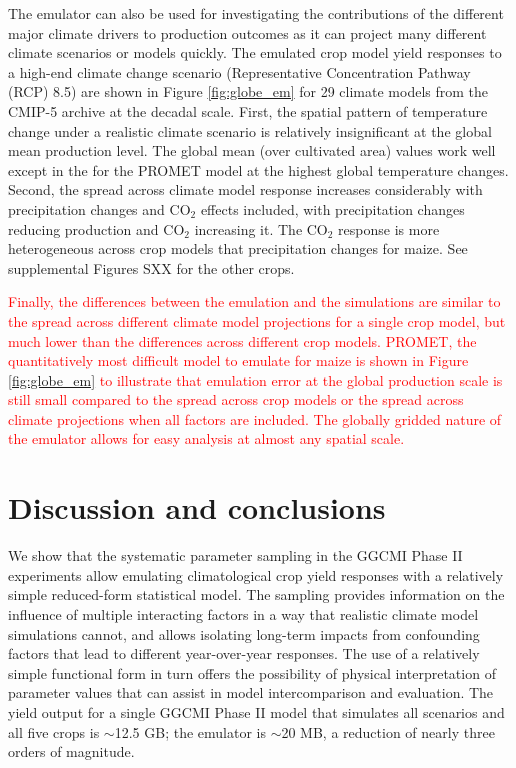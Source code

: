 \documentclass[gmd, manuscript]{copernicus} %
\begin{document}
The emulator can also be used for investigating the contributions of the different major climate drivers to production outcomes as it can project many different climate scenarios or models quickly.
The emulated crop model yield responses to a high-end climate change scenario (Representative Concentration Pathway (RCP) 8.5) are shown in Figure \ref{fig:globe_em} for 29 climate models from the CMIP-5 archive \citep{Taylor2012} at the decadal scale.
First, the spatial pattern of temperature change under a realistic climate scenario is relatively insignificant at the global mean production level.
The global mean (over cultivated area) values work well except in the for the PROMET model at the highest global temperature changes. 
Second, the spread across climate model response increases considerably with precipitation changes and CO$_2$ effects included, with precipitation changes reducing production and CO$_2$ increasing it.
The CO$_2$ response is more heterogeneous across crop models that precipitation changes for maize. 
See supplemental Figures SXX for the other crops.

\textcolor{red}{
Finally, the differences between the emulation and the simulations are similar to the spread across different climate model projections for a single crop model, but much lower than the differences across different crop models.
PROMET, the quantitatively most difficult model to emulate for maize is shown in Figure \ref{fig:globe_em} to illustrate that emulation error at the global production scale is still small compared to the spread across crop models or the spread across climate projections when all factors are included.
The globally gridded nature of the emulator allows for easy analysis at almost any spatial scale.
}


\section{Discussion and conclusions} 
\label{S:6}
We show that the systematic parameter sampling in the GGCMI Phase II experiments allow emulating climatological crop yield responses with a relatively simple reduced-form statistical model. 
The sampling provides information on the influence of multiple interacting factors in a way that realistic climate model simulations cannot, and allows isolating long-term impacts from confounding factors that lead to different year-over-year responses. 
The use of a relatively simple functional form in turn offers the possibility of physical interpretation of parameter values that can assist in model intercomparison and evaluation. 
The yield output for a single GGCMI Phase II model that simulates all scenarios and all five crops is $\sim$12.5 GB; the emulator is $\sim$20 MB, a reduction of nearly three orders of magnitude. 
\end{document}
